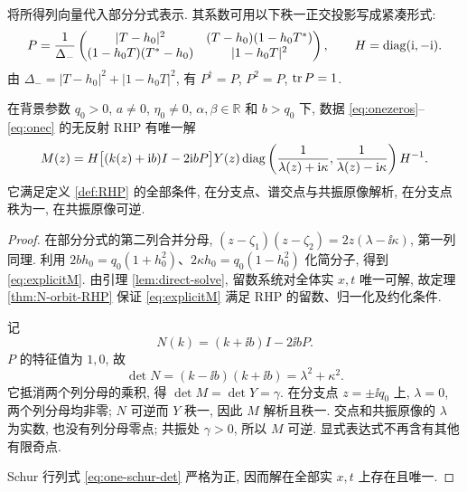 将所得列向量代入部分分式表示. 其系数可用以下秩一正交投影写成紧凑形式:
\begin{equation}\label{eq:algebraic-P}
P=\dfrac{1}{\Delta_-}
\begin{pmatrix}
|T-h_0|^2&(T-h_0)(1-h_0{T}^{*})\\
(1-h_0T)({T}^{*}-h_0)&|1-h_0T|^2
\end{pmatrix},\qquad H=\operatorname{diag}(\mathrm{i},-\mathrm{i}).
\end{equation}
由 $\Delta_-=|T-h_0|^2+|1-h_0T|^2$, 有 $P^\dagger=P$, $P^2=P$, $\operatorname{tr} P=1$.

\begin{theorem}\label{thm:oneRHP}\label{prop:unique-reflectionless}
在背景参数 $q_0>0$, $a\ne0$, $\eta_0\ne0$, $\alpha,\beta\in\mathbb R$ 和 $b>q_0$ 下, 数据 \eqref{eq:onezeros}--\eqref{eq:onec} 的无反射 RHP 有唯一解
\begin{equation}\label{eq:explicitM}
M(z)=H\bigl[(k(z)+\mathrm{i} b)I-2\mathrm{i} bP\bigr]Y(z)
\operatorname{diag}\left(\dfrac{1}{\lambda(z)+\mathrm{i}\kappa},\dfrac{1}{\lambda(z)-\mathrm{i}\kappa}\right)H^{-1}.
\end{equation}
它满足定义 \ref{def:RHP} 的全部条件, 在分支点、谱交点与共振原像解析, 在分支点秩为一, 在共振原像可逆.
\end{theorem}
\begin{proof}
在部分分式的第二列合并分母,
$(z-\zeta_1)(z-\zeta_2)=2z(\lambda-\ii\kappa)$, 第一列同理. 利用
$2bh_0=q_0(1+h_0^2)$、$2\kappa h_0=q_0(1-h_0^2)$ 化简分子, 得到 \eqref{eq:explicitM}.
由引理 \ref{lem:direct-solve}, 留数系统对全体实 $x,t$ 唯一可解, 故定理 \ref{thm:N-orbit-RHP} 保证 \eqref{eq:explicitM} 满足 RHP 的留数、归一化及约化条件.

记
\begin{equation}\label{eq:Nfactor}
N(k)=(k+\ii b)I-2\ii bP.
\end{equation}
$P$ 的特征值为 $1,0$, 故
\begin{equation*}
\det N=(k-\ii b)(k+\ii b)=\lambda^2+\kappa^2.
\end{equation*}
它抵消两个列分母的乘积, 得 $\det M=\det Y=\gamma$. 在分支点 $z=\pm\ii q_0$ 上, $\lambda=0$, 两个列分母均非零; $N$ 可逆而 $Y$ 秩一, 因此 $M$ 解析且秩一. 交点和共振原像的 $\lambda$ 为实数, 也没有列分母零点; 共振处 $\gamma>0$, 所以 $M$ 可逆. 显式表达式不再含有其他有限奇点.

Schur 行列式 \eqref{eq:one-schur-det} 严格为正, 因而解在全部实 $x,t$ 上存在且唯一.
\end{proof}

